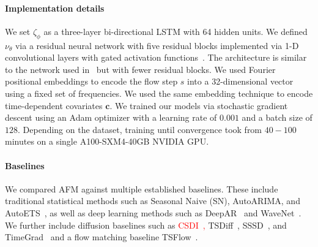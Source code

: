 \documentclass[a4paper,10pt,twocolumn,preprint,3p]{elsarticle}
\begin{document}
\paragraph{Implementation details} We set $\zeta_\phi$ as a three-layer bi-directional LSTM with 64 hidden units. We defined $\nu_\theta$ via a residual neural network with five residual blocks implemented via 1-D convolutional layers with gated activation functions~\citep{van2016wavenet, kong2020diffwave}. The architecture is similar to the network used in~\citep{rasul2021autoregressive} but with fewer residual blocks. We used Fourier positional embeddings to encode the flow step $s$ into a 32-dimensional vector using a fixed set of frequencies. We used the same embedding technique to encode time-dependent covariates $\mathbf{c}$. We trained our models via stochastic gradient descent using an Adam optimizer with a learning rate of $0.001$ and a batch size of $128$. Depending on the dataset, training until convergence took from $40-100$ minutes on a single A100-SXM4-40GB NVIDIA GPU. 


\paragraph{Baselines} We compared AFM against multiple established baselines.
These include traditional statistical methods such as Seasonal Naive (SN), AutoARIMA, and AutoETS~\citep{hyndman2008forecasting}, as well as deep learning methods such as DeepAR~\citep{salinas2020deepar} and WaveNet~\citep{van2016wavenet}. We further include diffusion baselines such as \textcolor{red}{CSDI~\citep{tashiro2021csdi},} TSDiff~\citep{kollovieh2023predict}, SSSD~\citep{alcaraz2022diffusion}, and TimeGrad~\citep{rasul2021autoregressive} and a flow matching baseline TSFlow~\citep{Kerrigan2024Flow}.
\end{document}
